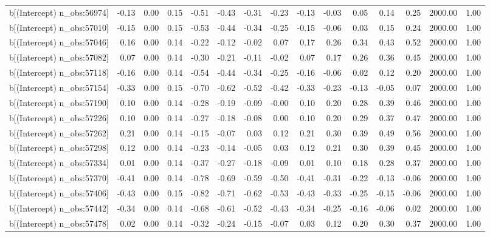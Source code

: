 \begin{table}[ht]
\begin{tabular}{rrrrrrrrrrrrrrr}
  b[(Intercept) n\_obs:56974] & -0.13 & 0.00 & 0.15 & -0.51 & -0.43 & -0.31 & -0.23 & -0.13 & -0.03 & 0.05 & 0.14 & 0.25 & 2000.00 & 1.00 \\ 
  b[(Intercept) n\_obs:57010] & -0.15 & 0.00 & 0.15 & -0.53 & -0.44 & -0.34 & -0.25 & -0.15 & -0.06 & 0.03 & 0.15 & 0.24 & 2000.00 & 1.00 \\ 
  b[(Intercept) n\_obs:57046] & 0.16 & 0.00 & 0.14 & -0.22 & -0.12 & -0.02 & 0.07 & 0.17 & 0.26 & 0.34 & 0.43 & 0.52 & 2000.00 & 1.00 \\ 
  b[(Intercept) n\_obs:57082] & 0.07 & 0.00 & 0.14 & -0.30 & -0.21 & -0.11 & -0.02 & 0.07 & 0.17 & 0.26 & 0.36 & 0.45 & 2000.00 & 1.00 \\ 
  b[(Intercept) n\_obs:57118] & -0.16 & 0.00 & 0.14 & -0.54 & -0.44 & -0.34 & -0.25 & -0.16 & -0.06 & 0.02 & 0.12 & 0.20 & 2000.00 & 1.00 \\ 
  b[(Intercept) n\_obs:57154] & -0.33 & 0.00 & 0.15 & -0.70 & -0.62 & -0.52 & -0.42 & -0.33 & -0.23 & -0.13 & -0.05 & 0.07 & 2000.00 & 1.00 \\ 
  b[(Intercept) n\_obs:57190] & 0.10 & 0.00 & 0.14 & -0.28 & -0.19 & -0.09 & -0.00 & 0.10 & 0.20 & 0.28 & 0.39 & 0.46 & 2000.00 & 1.00 \\ 
  b[(Intercept) n\_obs:57226] & 0.10 & 0.00 & 0.14 & -0.27 & -0.18 & -0.08 & 0.00 & 0.10 & 0.20 & 0.29 & 0.37 & 0.47 & 2000.00 & 1.00 \\ 
  b[(Intercept) n\_obs:57262] & 0.21 & 0.00 & 0.14 & -0.15 & -0.07 & 0.03 & 0.12 & 0.21 & 0.30 & 0.39 & 0.49 & 0.56 & 2000.00 & 1.00 \\ 
  b[(Intercept) n\_obs:57298] & 0.12 & 0.00 & 0.14 & -0.23 & -0.14 & -0.05 & 0.03 & 0.12 & 0.21 & 0.30 & 0.39 & 0.45 & 2000.00 & 1.00 \\ 
  b[(Intercept) n\_obs:57334] & 0.01 & 0.00 & 0.14 & -0.37 & -0.27 & -0.18 & -0.09 & 0.01 & 0.10 & 0.18 & 0.28 & 0.37 & 2000.00 & 1.00 \\ 
  b[(Intercept) n\_obs:57370] & -0.41 & 0.00 & 0.14 & -0.78 & -0.69 & -0.59 & -0.50 & -0.41 & -0.31 & -0.22 & -0.13 & -0.06 & 2000.00 & 1.00 \\ 
  b[(Intercept) n\_obs:57406] & -0.43 & 0.00 & 0.15 & -0.82 & -0.71 & -0.62 & -0.53 & -0.43 & -0.33 & -0.25 & -0.15 & -0.06 & 2000.00 & 1.00 \\ 
  b[(Intercept) n\_obs:57442] & -0.34 & 0.00 & 0.14 & -0.68 & -0.61 & -0.52 & -0.43 & -0.34 & -0.25 & -0.16 & -0.06 & 0.02 & 2000.00 & 1.00 \\ 
  b[(Intercept) n\_obs:57478] & 0.02 & 0.00 & 0.14 & -0.32 & -0.24 & -0.15 & -0.07 & 0.03 & 0.12 & 0.20 & 0.30 & 0.37 & 2000.00 & 1.00 \\ 

\end{tabular}
\end{table}
